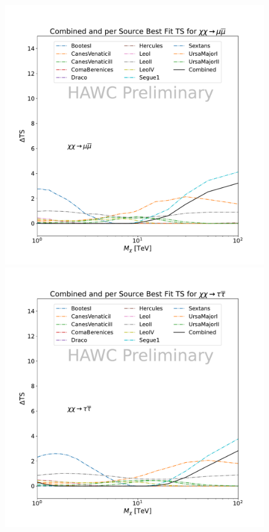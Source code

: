 \begin{figure}[h]
{        \includegraphics[scale=0.21]{figures/glory_duck/hawc/CombinedTS_data_mumu_.pdf}
        \includegraphics[scale=0.21]{figures/glory_duck/hawc/CombinedTS_data_tautau_.pdf}
}
\end{figure}
